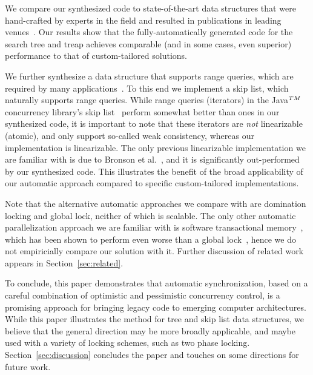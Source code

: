 We compare our synthesized code to state-of-the-art data structures 
that were hand-crafted by experts in the field and resulted in publications in 
leading venues~\cite{DrachslerVY2014,BronsonCCO2010}. Our results show that the 
fully-automatically generated code for the search tree and treap
achieves comparable (and in some cases, even superior) performance to that of 
custom-tailored solutions. 

We further synthesize a data structure that supports range queries, which are required by 
many applications~\cite{levelDB,xxx}. To this end we implement a skip list, which naturally supports range queries. 
While range queries (iterators) in the Java$^{\sc TM}$ concurrency library's skip list~\cite{xxx} perform 
somewhat better than ones in our synthesized code, it is important to note that these iterators are \emph{not}
linearizable (atomic), and only support so-called weak consistency, whereas our implementation is linearizable.
The only previous linearizable implementation we are familiar with is due to Bronson et al.~\cite{BronsonCCO2010},
and it is significantly out-performed by our synthesized code. This illustrates the benefit of the broad applicability
of our automatic approach compared to specific custom-tailored implementations.

Note that the alternative automatic approaches we compare with are domination locking and global lock, neither of which is scalable. The only other automatic parallelization approach we are familiar with is software transactional memory~\cite{xxx},
which has been shown to perform even worse than a global lock~\cite{}, hence we do not empiricially
compare our solution with it. Further discussion of related work appears in Section~\ref{sec:related}. 

To conclude, this paper demonstrates that automatic synchronization, based on a careful combination of optimistic and
pessimistic concurrency control, is a promising approach for bringing legacy code to emerging computer architectures. 
While this paper illustrates the method for tree and skip list data structures, we believe that the general direction may be more broadly applicable, and maybe used with a variety of locking schemes, such as two phase locking. 
Section~\ref{sec:discussion} concludes the paper and touches on some directions for future work. 